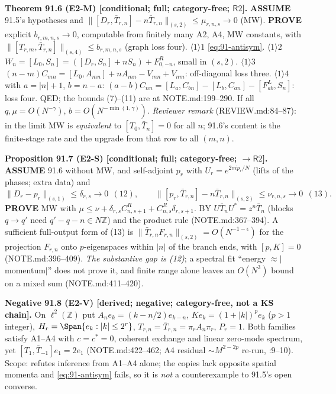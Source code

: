\textbf{Theorem 91.6 (E2-M) [conditional; full; category-free; \(\mathsf R2\)].}  \textbf{ASSUME} 91.5's hypotheses and
\(\|[D_r,\bar T_{r,n}]-n\bar T_{r,n}\|_{(s,2)}\le\mu_{r,n,s}\to0\) (MW).  \textbf{PROVE} explicit
\(b_{r,m,n,s}\to0\), computable from finitely many A2, A4, MW constants, with
\(\|[T_{r,m},\bar T_{r,n}]\|_{(s,4)}\le b_{r,m,n,s}\) (graph loss four).
\(\langle1\rangle1\) \eqref{eq:91-antisym}.  \(\langle1\rangle2\) \(W_n=[L_0,S_n]=([D_r,S_n]+nS_n)+F^R_{0,-n}\), small in
\((s,2)\).  \(\langle1\rangle3\) \((n-m)C_{mn}=[L_0,A_{mn}]+nA_{mn}-V_{mn}+V_{nm}\): off-diagonal loss three.
\(\langle1\rangle4\) with \(a=|n|+1\), \(b=n-a\): \((a-b)C_{nn}=[L_a,C_{bn}]-[L_b,C_{an}]-[F^L_{ab},S_n]\): loss four.  QED; the
bounds (7)--(11) are at NOTE.md:199--290.  If all \(q,\mu=O(N^{-\gamma})\), \(b=O(N^{-\min(1,\gamma)})\).
\emph{Reviewer remark} (REVIEW.md:84--87): in the limit MW is \emph{equivalent} to \([T_0,\bar T_n]=0\) for all \(n\);
91.6's content is the finite-stage rate and the upgrade from that row to all \((m,n)\).

\textbf{Proposition 91.7 (E2-S) [conditional; full; category-free; \(\to\mathsf R2\)].}  \textbf{ASSUME} 91.6 without MW,
and self-adjoint \(p_r\) with \(U_r=e^{2\pi ip_r/N}\) (lifts of the phases; extra data) and
\[
  \|D_r-p_r\|_{(s,1)}\le\delta_{r,s}\to0\ \ (12),\qquad
  \|[p_r,\bar T_{r,n}]-n\bar T_{r,n}\|_{(s,2)}\le\nu_{r,n,s}\to0\ \ (13).
\]
\textbf{PROVE} MW with \(\mu\le\nu+\delta_{r,s}C^R_{n,s+1}+C^R_{n,s}\delta_{r,s+1}\).  BY \(U\bar T_nU^*=z^n\bar T_n\) (blocks
\(q\to q'\) need \(q'-q-n\in N\mathbb Z\)) and the product rule (NOTE.md:367--394).  A sufficient full-output form
of (13) is \(\|\bar T_{r,n}F_{r,n}\|_{(s,2)}=O(N^{-1-\epsilon})\) for the projection \(F_{r,n}\) onto \(p\)-eigenspaces within
\(|n|\) of the branch ends, with \([p,K]=0\) (NOTE.md:396--409).  \emph{The substantive gap is (12)}; a spectral
fit ``energy \(\approx|\)momentum\(|\)'' does not prove it, and finite range alone leaves an \(O(N^3)\) bound on a mixed
sum (NOTE.md:411--420).

\textbf{Negative 91.8 (E2-V) [derived; negative; category-free, not a KS chain].}  On \(\ell^2(\mathbb Z)\) put
\(A_ne_k=(k-n/2)e_{k-n}\), \(Ke_k=(1+|k|)^pe_k\) (\(p>1\) integer), \(H_r=\Span\{e_k:|k|\le2^r\}\), \(T_{r,n}=\bar T_{r,n}=
\pi_rA_n\pi_r\), \(P_r=1\).  Both families satisfy A1--A4 with \(c=c^*=0\), coherent exchange and linear zero-mode
spectrum, yet \([T_1,\bar T_{-1}]e_1=2e_1\) (NOTE.md:422--462; A4 residual \(\sim M^{2-2p}\) re-run,
:9--10).  Scope: refutes inference from A1--A4 alone; the copies lack opposite spatial
momenta and \eqref{eq:91-antisym} fails, so it is \emph{not} a counterexample to 91.5's open converse.

